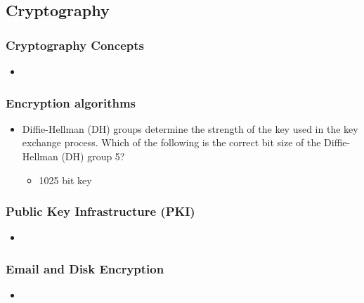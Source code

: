 \subsection{Cryptography}
\subsubsection{Cryptography Concepts}
\begin{itemize}
    \item 
\end{itemize}
\subsubsection{Encryption algorithms}
\begin{itemize}
    \item Diffie-Hellman (DH) groups determine the strength of the key used in the key exchange process. Which of the following is the correct bit size of the Diffie-Hellman (DH) group 5?
    \begin{itemize}
        \item 1025 bit key
    \end{itemize}
\end{itemize}
\subsubsection{Public Key Infrastructure (PKI)}
\begin{itemize}
    \item 
\end{itemize}
\subsubsection{Email and Disk Encryption}
\begin{itemize}
    \item 
\end{itemize}
